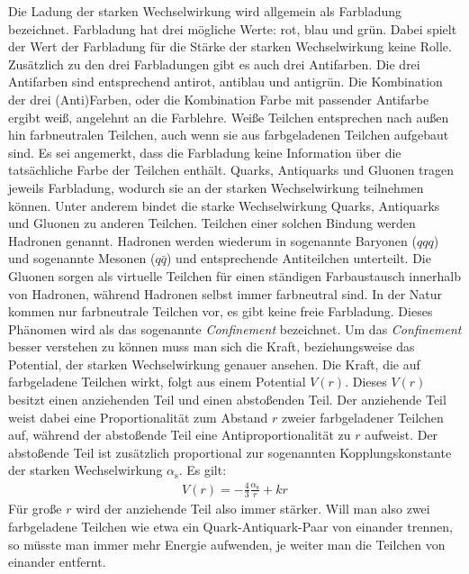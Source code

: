 Die Ladung der starken Wechselwirkung wird allgemein als Farbladung bezeichnet.
Farbladung hat drei m\"ogliche \grqq{}Werte\grqq{}: rot, blau und gr\"un.
Dabei spielt der \grqq{}Wert\grqq{} der Farbladung f\"ur die St\"arke der starken Wechselwirkung keine Rolle.
Zus\"atzlich zu den drei Farbladungen gibt es auch drei Antifarben. 
Die drei Antifarben sind entsprechend antirot, antiblau und antigr\"un.
Die Kombination der drei (Anti)Farben, oder die Kombination Farbe mit passender Antifarbe ergibt wei{\ss}, angelehnt an die Farblehre.
Wei{\ss}e Teilchen entsprechen nach au{\ss}en hin farbneutralen Teilchen, auch wenn sie aus farbgeladenen Teilchen aufgebaut sind.
Es sei angemerkt, dass die Farbladung keine Information \"uber die tats\"achliche Farbe der Teilchen enth\"alt. 
Quarks, Antiquarks und Gluonen tragen jeweils Farbladung, wodurch sie an der starken Wechselwirkung teilnehmen k\"onnen.
Unter anderem bindet die starke Wechselwirkung Quarks, Antiquarks und Gluonen zu anderen Teilchen.
Teilchen einer solchen Bindung werden Hadronen genannt. Hadronen werden wiederum in sogenannte Baryonen ($qqq$) und sogenannte Mesonen ($q\bar{q}$) und entsprechende Antiteilchen unterteilt.
Die Gluonen sorgen als virtuelle Teilchen f\"ur einen st\"andigen Farbaustausch innerhalb von Hadronen, w\"ahrend Hadronen selbst immer farbneutral sind.
In der Natur kommen nur farbneutrale Teilchen vor, es gibt keine freie Farbladung.
Dieses Ph\"anomen wird als das sogenannte \textit{Confinement} bezeichnet.
Um das \textit{Confinement} besser verstehen zu k\"onnen muss man sich die Kraft, beziehungsweise das Potential, der starken Wechselwirkung genauer ansehen.
\newline
Die Kraft, die auf farbgeladene Teilchen wirkt, folgt aus einem Potential $V(r)$.
Dieses $V(r)$ besitzt einen anziehenden Teil und einen abstoßenden Teil.
Der anziehende Teil weist dabei eine Proportionalit\"at zum Abstand $r$ zweier farbgeladener Teilchen auf, w\"ahrend der absto{\ss}ende Teil eine Antiproportionalit\"at zu $r$ aufweist.
Der absto{\ss}ende Teil ist zus\"atzlich proportional zur sogenannten Kopplungskonstante der starken Wechselwirkung $\alpha_\text{s}$.
Es gilt:
\begin{align} \label{eq:Potential}
V(r) = -\frac{4}{3}\frac{\alpha_\text{s}}{r} + kr
\end{align}
F\"ur gro{\ss}e $r$ wird der anziehende Teil also immer stärker.
Will man also zwei farbgeladene Teilchen wie etwa ein Quark-Antiquark-Paar von einander trennen, so m\"usste man immer mehr Energie aufwenden, je weiter man die Teilchen von einander entfernt.
